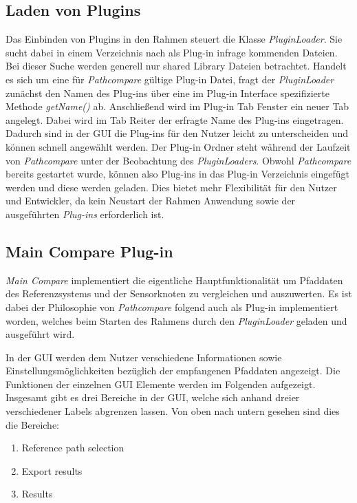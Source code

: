 \subsection{Laden von Plugins}
Das Einbinden von Plugins in den Rahmen steuert die Klasse
\textit{PluginLoader}. Sie sucht dabei in einem Verzeichnis nach als Plug-in
infrage kommenden Dateien. Bei dieser Suche werden generell nur shared Library
Dateien betrachtet. Handelt es sich um eine für \textit{Pathcompare} gültige
Plug-in Datei, fragt der \textit{PluginLoader} zunächst den Namen des Plug-ins
über eine im Plug-in Interface spezifizierte Methode \textit{getName()} ab.
Anschließend wird im Plug-in Tab Fenster ein neuer Tab angelegt. Dabei wird im
Tab Reiter der erfragte Name des Plug-ins eingetragen. Dadurch sind in der GUI die Plug-ins für den
Nutzer leicht zu unterscheiden und können schnell angewählt werden.
Der Plug-in Ordner steht während der Laufzeit von \textit{Pathcompare}
unter der Beobachtung des \textit{PluginLoaders}. 
Obwohl \textit{Pathcompare} bereits gestartet wurde, können also Plug-ins in das Plug-in
Verzeichnis eingefügt werden und diese werden geladen. Dies bietet mehr Flexibilität für den
Nutzer und Entwickler, da kein Neustart der Rahmen Anwendung sowie der ausgeführten
\textit{Plug-ins} erforderlich ist.


\subsection{Main Compare Plug-in}
\label{sub:maincompare}


\textit{Main Compare} implementiert die eigentliche Hauptfunktionalität um Pfaddaten des
Referenzsystems und der Sensorknoten zu vergleichen und auszuwerten. 
Es ist dabei der Philosophie von \textit{Pathcompare} folgend auch als Plug-in
implementiert worden, welches beim Starten des Rahmens durch den
\textit{PluginLoader} geladen und ausgeführt wird.

In der GUI werden dem Nutzer verschiedene Informationen sowie
Einstellungsmöglichkeiten bezüglich der
empfangenen Pfaddaten angezeigt. Die Funktionen der einzelnen GUI Elemente
werden im Folgenden aufgezeigt.
Insgesamt gibt es drei Bereiche in der GUI, welche sich anhand dreier
verschiedener Labels abgrenzen lassen. Von oben nach untern gesehen sind
dies die Bereiche:

\begin{enumerate}
  \item Reference path selection
  \item Export results
  \item Results
\end{enumerate}

